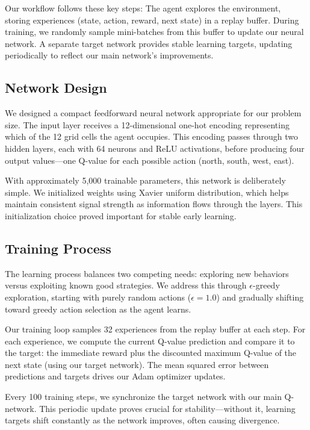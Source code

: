 \documentclass[conference]{IEEEtran}
\begin{document}
Our workflow follows these key steps: The agent explores the environment, storing experiences (state, action, reward, next state) in a replay buffer. During training, we randomly sample mini-batches from this buffer to update our neural network. A separate target network provides stable learning targets, updating periodically to reflect our main network's improvements.

\subsection{Network Design}

We designed a compact feedforward neural network appropriate for our problem size. The input layer receives a 12-dimensional one-hot encoding representing which of the 12 grid cells the agent occupies. This encoding passes through two hidden layers, each with 64 neurons and ReLU activations, before producing four output values—one Q-value for each possible action (north, south, west, east).

With approximately 5,000 trainable parameters, this network is deliberately simple. We initialized weights using Xavier uniform distribution, which helps maintain consistent signal strength as information flows through the layers. This initialization choice proved important for stable early learning.

\subsection{Training Process}

The learning process balances two competing needs: exploring new behaviors versus exploiting known good strategies. We address this through $\epsilon$-greedy exploration, starting with purely random actions ($\epsilon=1.0$) and gradually shifting toward greedy action selection as the agent learns.

Our training loop samples 32 experiences from the replay buffer at each step. For each experience, we compute the current Q-value prediction and compare it to the target: the immediate reward plus the discounted maximum Q-value of the next state (using our target network). The mean squared error between predictions and targets drives our Adam optimizer updates.

Every 100 training steps, we synchronize the target network with our main Q-network. This periodic update proves crucial for stability—without it, learning targets shift constantly as the network improves, often causing divergence.
\end{document}
